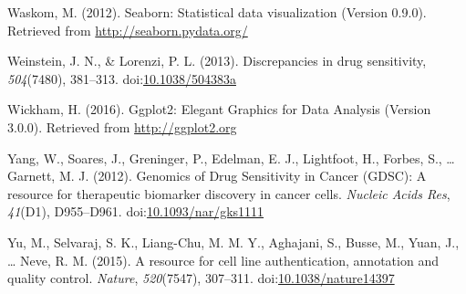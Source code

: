 \documentclass[man,floatsintext]{apa6}
\begin{document}
\hypertarget{ref-waskom2012}{}
Waskom, M. (2012). Seaborn: Statistical data visualization (Version
0.9.0). Retrieved from \url{http://seaborn.pydata.org/}

\hypertarget{ref-weinstein2013}{}
Weinstein, J. N., \& Lorenzi, P. L. (2013). Discrepancies in drug
sensitivity, \emph{504}(7480), 381--313.
doi:\href{https://doi.org/10.1038/504383a}{10.1038/504383a}

\hypertarget{ref-wickham2016}{}
Wickham, H. (2016). Ggplot2: Elegant Graphics for Data Analysis (Version
3.0.0). Retrieved from \url{http://ggplot2.org}

\hypertarget{ref-yang2012}{}
Yang, W., Soares, J., Greninger, P., Edelman, E. J., Lightfoot, H.,
Forbes, S., \ldots{} Garnett, M. J. (2012). Genomics of Drug Sensitivity
in Cancer (GDSC): A resource for therapeutic biomarker discovery in
cancer cells. \emph{Nucleic Acids Res}, \emph{41}(D1), D955--D961.
doi:\href{https://doi.org/10.1093/nar/gks1111}{10.1093/nar/gks1111}

\hypertarget{ref-yu2015}{}
Yu, M., Selvaraj, S. K., Liang-Chu, M. M. Y., Aghajani, S., Busse, M.,
Yuan, J., \ldots{} Neve, R. M. (2015). A resource for cell line
authentication, annotation and quality control. \emph{Nature},
\emph{520}(7547), 307--311.
doi:\href{https://doi.org/10.1038/nature14397}{10.1038/nature14397}

\endgroup
\end{document}

